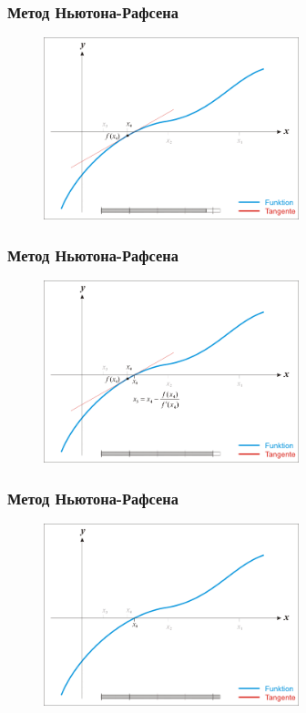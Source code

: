 \documentclass[12pt]{beamer}
\begin{document}
\begin{frame}\frametitle{Метод Ньютона-Рафсена}
\begin{figure}[htbp]
  \includegraphics[height=150pt, keepaspectratio = true]{images/newton-15}   
\end{figure}
\end{frame}
\begin{frame}\frametitle{Метод Ньютона-Рафсена}
\begin{figure}[htbp]
  \includegraphics[height=150pt, keepaspectratio = true]{images/newton-16}   
\end{figure}
\end{frame}
\begin{frame}\frametitle{Метод Ньютона-Рафсена}
\begin{figure}[htbp]
  \includegraphics[height=150pt, keepaspectratio = true]{images/newton-17}   
\end{figure}
\end{frame}
\end{document}
